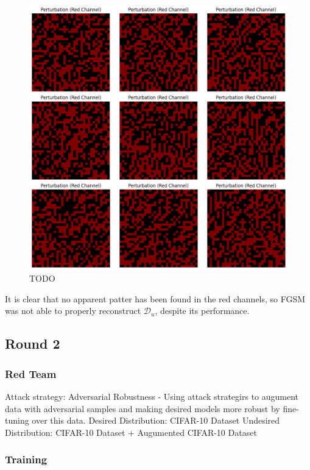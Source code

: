 \documentclass[letterpaper]{article} %
\begin{document}
\begin{figure}[h!]
\centering
\includegraphics[width=\columnwidth]{figures/round_1_FGSM_reverse_eng_red.png}
\caption{TODO}
\end{figure}

It is clear that no apparent patter has been found in the red channels, so FGSM was not able to properly reconstruct $\mathcal{D}_u$, despite its performance.


\subsection{Round 2}
\subsubsection{Red Team} 

Attack strategy: Adversarial Robustness - Using attack strategirs to augument data with adversarial samples and making desired models more robust by fine-tuning over this data. 
Desired Distribution: CIFAR-10 Dataset
Undesired Distribution: CIFAR-10 Dataset + Augumented CIFAR-10 Dataset

\subsubsection{Training}
\end{document}
